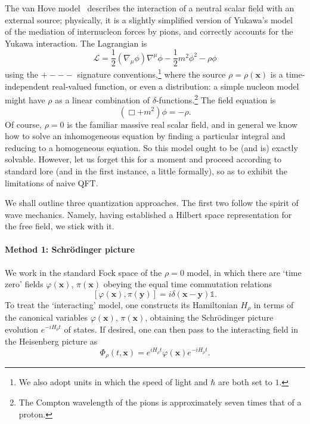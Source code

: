 \documentclass[12pt,a4paper]{article}
\newcommand{\1}{\mathds{1}}                         %
\newcommand{\xb}{{\boldsymbol{x}}}
\newcommand{\yb}{{\boldsymbol{y}}}
\begin{document}
	The van Hove model~\cite{vanHove:1952} describes the interaction of a neutral scalar field with an external source; physically, it is a slightly simplified version of Yukawa's model~\cite{Yukawa:1935} of the mediation of
	internucleon forces by pions, and correctly accounts for the Yukawa interaction. The Lagrangian is
	\[
	\mathcal{L} =\frac{1}{2}(\nabla_\mu\phi)\nabla^\mu\phi - \frac{1}{2}m^2\phi^2
	-\rho\phi
	\]
	using the ${+}{-}{-}{-}$ signature conventions,\footnote{We also adopt units in which the speed of light and $\hbar$ are both set to $1$.}
	where the source $\rho=\rho(\xb)$ is a time-independent real-valued function, or even a distribution: a simple nucleon model might have $\rho$ as a linear combination of $\delta$-functions.\footnote{The Compton wavelength of the pions is approximately seven times that of a proton.} The field equation is
	\begin{equation}\label{eq:vHeq}
	(\Box+m^2)\phi=-\rho.
	\end{equation}
	Of course, $\rho=0$ is the familiar massive real scalar field, and in general
	we know how to solve an inhomogeneous equation by finding a particular integral
	and reducing to a homogeneous equation. So this model ought to be (and is) exactly solvable. However, let us forget this for a moment and proceed according to standard lore (and in the first instance, a little formally), so as to exhibit the limitations of naive QFT. 
	
	We shall outline three quantization approaches. The first two follow the spirit of wave mechanics. Namely, having established a Hilbert space representation for the free field, we stick with it.
	\paragraph{Method 1: Schr\"odinger picture} We work in the standard Fock space of the $\rho=0$ model, in which there are `time zero' fields $\varphi(\xb)$, $\pi(\xb)$ obeying the equal time commutation relations
	\begin{equation}\label{eq:ETCR}
	[\varphi(\xb),\pi(\yb)]=i\delta(\xb-\yb)\mathbb{1}.
	\end{equation}
	To treat the `interacting' model, one constructs its Hamiltonian $H_\rho$ in terms of the  canonical variables $\varphi(\xb)$, $\pi(\xb)$, obtaining the Schr\"odinger picture evolution $e^{-iH_\rho t}$ of states. If desired, one can then pass to 
	the interacting field in the Heisenberg picture as 
	\[
	\Phi_\rho(t,\xb)=e^{iH_\rho t}\varphi(\xb)e^{-iH_\rho t}.
	\]
\end{document}
